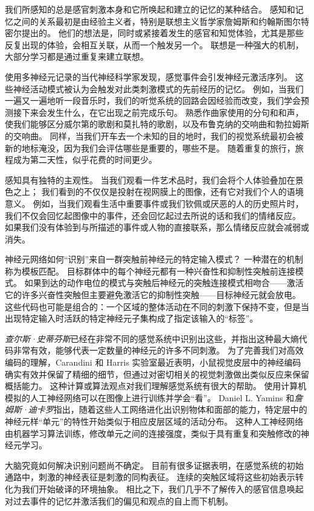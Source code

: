 我们所感知的总是感官刺激本身和它所唤起和建立的记忆的某种结合。 
感知和记忆之间的关系最初是由经验主义者，特别是联想主义哲学家詹姆斯和约翰斯图尔特密尔提出的。 
他们的想法是，同时或紧接着发生的感官和知觉体验，尤其是那些反复出现的体验，会相互关联，从而一个触发另一个。 
联想是一种强大的机制，大部分学习都是通过重复来建立联想。


使用多神经元记录的当代神经科学家发现，感觉事件会引发神经元激活序列。 
这些神经活动模式被认为会触发对此类刺激模式的先前经历的记忆。 
例如，当我们一遍又一遍地听一段音乐时，我们的听觉系统的回路会因经验而改变，我们学会预测接下来会发生什么，在它出现之前完成乐句。 
熟悉作曲家使用的分句和和声，使我们能够区分威尔第的歌剧和莫扎特的歌剧，以及布鲁克纳的交响曲和勃拉姆斯的交响曲。 
同样，当我们开车去一个未知的目的地时，我们的视觉系统最初会被新的地标淹没，因为我们会评估哪些是重要的，哪些不是。 
随着重复的旅行，旅程成为第二天性，似乎花费的时间更少。


感知具有独特的主观性。 
当我们观看一件艺术品时，我们会将个人体验叠加在景色之上； 我们看到的不仅仅是投射在视网膜上的图像，还有它对我们个人的语境意义。 
例如，当我们观看生活中重要事件或我们钦佩或厌恶的人的历史照片时，我们不仅会回忆起图像中的事件，还会回忆起过去所说的话和我们的情绪反应。 
如果我们没有体验到与所描述的事件或人物的直接联系，那么情绪反应就会减弱或消失。


神经元网络如何“识别”来自一群突触前神经元的特定输入模式？ 
一种潜在的机制称为模板匹配。 
目标群体中的每个神经元都有一种兴奋性和抑制性突触前连接模式。 
如果到达的动作电位的模式与突触后神经元的突触连接模式相吻合——激活它的许多兴奋性突触但主要避免激活它的抑制性突触——目标神经元就会放电。 
这些代码也可能是组合的：一个区域的整体活动在不同的刺激下保持不变，但是当出现特定输入时活跃的特定神经元子集构成了指定该输入的“标签”。


\textit{查尔斯·史蒂芬斯}已经在非常不同的感觉系统中识别出这些，并指出这种最大熵代码非常有效，能够代表一定数量的神经元的许多不同刺激。
为了完善我们对高效编码的理解，Carandini 和 Harris 实验室最近表明，小鼠视觉皮层中的神经编码确实有效并保留了精细的细节，但通过对密切相关的视觉刺激做出类似反应来保留概括能力。 
这种计算或算法观点对我们理解感觉系统有很大的帮助。 
使用计算机模拟的人工神经网络可以在图像上进行训练并学会“看”。
Daniel L. Yamins 和\textit{詹姆斯·迪卡罗}指出，随着这些人工网络进化出识别物体和面部的能力，特定层中的神经元样“单元”的特性开始类似于相应皮层区域的活动分布。
这种人工神经网络由机器学习算法训练，修改单元之间的连接强度，类似于具有重复和突触修改的神经元学习。


大脑究竟如何解决识别问题尚不确定。 
目前有很多证据表明，在感觉系统的初始通路中，刺激的神经表征是刺激的同构表征。 
连续的突触区域将这些初始表示转化为我们开始破译的环境抽象。 
相比之下，我们几乎不了解传入的感官信息唤起对过去事件的记忆并激活我们的偏见和观点的自上而下机制。



